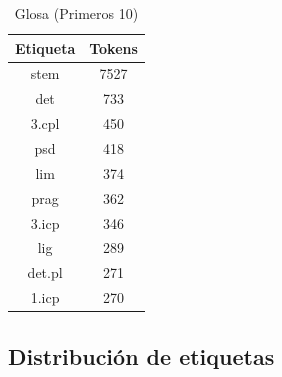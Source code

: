 \documentclass[letterpaper,12pt,oneside]{scrbook}
\theoremstyle{definition}
\begin{document}
	
	
	\begin{table}[ht]

		\centering

		\begin{tabular}{c | c}                            

			\textbf{Etiqueta} & \textbf{Tokens} \\ \hline

			stem & 7527 \\

			det & 733 \\

			3.cpl & 450 \\

			psd & 418 \\

			lim & 374 \\

			prag & 362 \\

			3.icp & 346 \\

			lig & 289 \\

			det.pl & 271 \\

			1.icp & 270 \\

		\end{tabular}

		\caption{Glosa (Primeros 10)}

		\label{table_gloss_tokens}

	\end{table}

	
	


	\subsection{Distribución de etiquetas}
\end{document}
